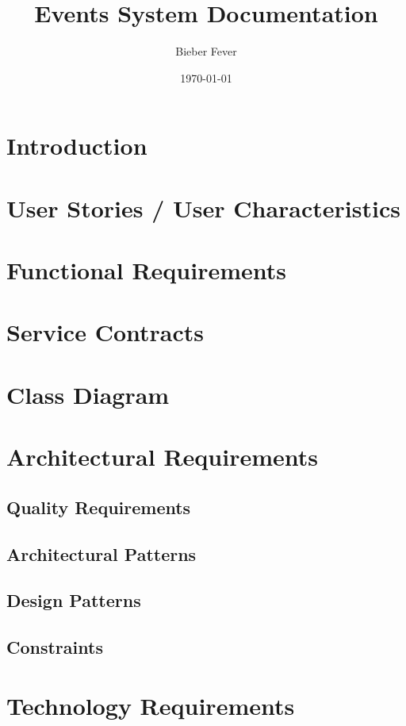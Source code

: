 \documentclass[a4paper,12pt]{article}
\title{Events System Documentation}
\author{Bieber Fever}
\date{\today}
\begin{document}
\maketitle
\tableofcontents

\section{Introduction}
\label{sec:introduction}

\section{User Stories / User Characteristics}
\label{sec:user-stories}

\section{Functional Requirements}
\label{sec:functional-requirements}

\section{Service Contracts}
\label{sec:service-contracts}

\section{Class Diagram}
\label{sec:class-diagram}

\section{Architectural Requirements}
\label{sec:architectural-requirements}

\subsection{Quality Requirements}
\label{subsec:quality-requirements}

\subsection{Architectural Patterns}
\label{subsec:architectural-patterns}

\subsection{Design Patterns}
\label{subsec:design-patterns}

\subsection{Constraints}
\label{subsec:constraints}

\section{Technology Requirements}
\label{sec:technology-requirements}
\end{document}
